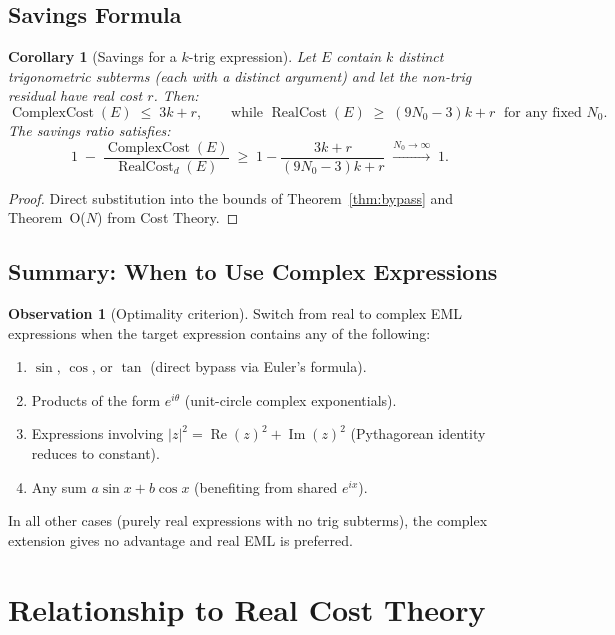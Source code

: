 \documentclass[12pt,a4paper]{article}
\newtheorem{corollary}[theorem]{Corollary}
\theoremstyle{definition}
\newtheorem{observation}[theorem]{Observation}
\newcommand{\RC}{\operatorname{RealCost}}
\newcommand{\CC}{\operatorname{ComplexCost}}
\begin{document}
\subsection{Savings Formula}

\begin{corollary}[Savings for a $k$-trig expression]
\label{cor:savings}
Let $E$ contain $k$ distinct trigonometric subterms (each with a distinct
argument) and let the non-trig residual have real cost $r$.
Then:
\[
  \CC(E) \;\leq\; 3k + r,
  \qquad
  \text{while } \RC(E) \;\geq\; (9N_0 - 3)k + r \;\text{ for any fixed } N_0.
\]
The savings ratio satisfies:
\[
  1 \;-\; \frac{\CC(E)}{\RC_d(E)} \;\geq\; 1 - \frac{3k + r}{(9N_0 - 3)k + r}
  \;\xrightarrow{N_0 \to \infty}\; 1.
\]
\end{corollary}

\begin{proof}
Direct substitution into the bounds of Theorem~\ref{thm:bypass} and
Theorem~O($N$) from Cost Theory.
\end{proof}

\subsection{Summary: When to Use Complex Expressions}

\begin{observation}[Optimality criterion]
\label{obs:criterion}
Switch from real to complex EML expressions when the target expression
contains any of the following:
\begin{enumerate}
  \item $\sin$, $\cos$, or $\tan$ (direct bypass via Euler's formula).
  \item Products of the form $e^{i\theta}$ (unit-circle complex exponentials).
  \item Expressions involving $|z|^2 = \operatorname{Re}(z)^2 +
        \operatorname{Im}(z)^2$ (Pythagorean identity reduces to constant).
  \item Any sum $a\sin x + b\cos x$ (benefiting from shared $e^{ix}$).
\end{enumerate}
In all other cases (purely real expressions with no trig subterms),
the complex extension gives no advantage and real EML is preferred.
\end{observation}

\section{Relationship to Real Cost Theory}
\label{sec:relationship}
\end{document}
